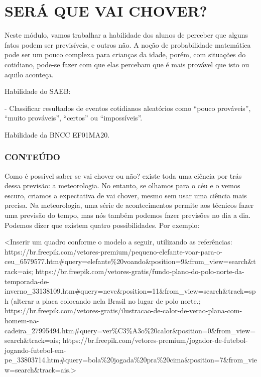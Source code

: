 \chapter{SERÁ QUE VAI CHOVER?}

Neste módulo, vamos trabalhar a habilidade dos alunos de
perceber que alguns fatos podem ser previsíveis, e outros não. A
noção de probabilidade matemática pode ser um pouco complexa para
crianças da idade, porém, com situações do cotidiano, pode-se fazer com que elas percebam que é mais provável que isto ou aquilo aconteça.

Habilidade do SAEB:

- Classificar resultados de eventos cotidianos aleatórios como ``pouco
prováveis'', ``muito prováveis'', ``certos'' ou ``impossíveis''.

Habilidade da BNCC
EF01MA20.

\subsection{CONTEÚDO}\label{conteuxfado-5}

Como é possivel saber se vai chover ou não? existe toda uma ciência por trás dessa previsão: a meteorologia.
No entanto, se olhamos para o céu e o vemos escuro, criamos a expectativa de vai chover, mesmo sem usar uma ciência mais precisa. Na meteorologia, uma série de acontecimentos
permite aos técnicos fazer uma previsão do tempo, mas nós também podemos fazer previsões no dia a dia. Podemos dizer que existem quatro possibilidades. Por exemplo:

\textless{}Inserir um quadro conforme o modelo a seguir, utilizando as
referências:
https://br.freepik.com/vetores-premium/pequeno-elefante-voar-para-o-ceu\_6579577.htm\#query=elefante\%20voando\&position=9\&from\_view=search\&track=ais;
https://br.freepik.com/vetores-gratis/fundo-plano-do-polo-norte-da-temporada-de-inverno\_33138109.htm\#query=neve\&position=11\&from\_view=search\&track=sph
(alterar a placa colocando nela Brasil no lugar de polo norte.;
https://br.freepik.com/vetores-gratis/ilustracao-de-calor-de-verao-plana-com-homem-na-cadeira\_27995494.htm\#query=ver\%C3\%A3o\%20calor\&position=0\&from\_view=search\&track=ais;
https://br.freepik.com/vetores-premium/jogador-de-futebol-jogando-futebol-em-pe\_33803714.htm\#query=bola\%20jogada\%20pra\%20cima\&position=7\&from\_view=search\&track=ais.\textgreater{}

